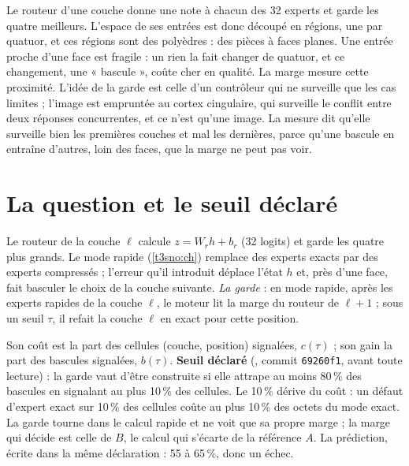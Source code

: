 \begin{enbref}
Le routeur d'une couche donne une note à chacun des 32 experts et garde les quatre meilleurs. L'espace de ses entrées est donc découpé en régions, une par quatuor, et ces régions sont des polyèdres : des pièces à faces planes. Une entrée proche d'une face est fragile : un rien la fait changer de quatuor, et ce changement, une « bascule », coûte cher en qualité. La marge mesure cette proximité. L'idée de la garde est celle d'un contrôleur qui ne surveille que les cas limites ; l'image est empruntée au cortex cingulaire, qui surveille le conflit entre deux réponses concurrentes, et ce n'est qu'une image. La mesure dit qu'elle surveille bien les premières couches et mal les dernières, parce qu'une bascule en entraîne d'autres, loin des faces, que la marge ne peut pas voir.
\end{enbref}

\section{La question et le seuil déclaré}\label{t3tro:sec:question}

Le routeur de la couche $\ell$ calcule $z = W_r h + b_r$ (32 logits) et garde les quatre plus grands. Le mode rapide (\cref{t3sno:ch}) remplace des experts exacts par des experts compressés ; l'erreur qu'il introduit déplace l'état $h$ et, près d'une face, fait basculer le choix de la couche suivante. \emph{La garde} : en mode rapide, après les experts rapides de la couche $\ell$, le moteur lit la marge du routeur de $\ell + 1$ ; sous un seuil $\tau$, il refait la couche $\ell$ en exact pour cette position.

Son coût est la part des cellules (couche, position) signalées, $c(\tau)$ ; son gain la part des bascules signalées, $b(\tau)$. \textbf{Seuil déclaré} (, commit \texttt{69260f1}, avant toute lecture) : la garde vaut d'être construite si elle attrape au moins 80\,\% des bascules en signalant au plus 10\,\% des cellules. Le 10\,\% dérive du coût : un défaut d'expert exact sur 10\,\% des cellules coûte au plus 10\,\% des octets du mode exact. La garde tourne dans le calcul rapide et ne voit que sa propre marge ; la marge qui décide est celle de $B$, le calcul qui s'écarte de la référence $A$. La prédiction, écrite dans la même déclaration : 55 à 65\,\%, donc un échec.

